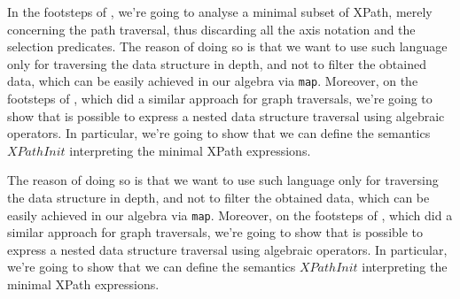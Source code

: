 In the footsteps of \cite{Magnani06}, we're going to analyse a minimal subset of XPath, merely concerning the path traversal, thus discarding all the axis notation and the selection predicates. The reason of doing so is that we want to use such language only for traversing the data structure in depth, and not to filter the obtained data, which can be easily achieved in our algebra via \texttt{map}. Moreover, on the footsteps of \cite{NautiLOD}, which did a similar approach for graph traversals, we're going to show that is possible to express a nested data structure traversal using algebraic operators. In particular, we're going to show that we can define the semantics $XPathInit$ interpreting the minimal XPath expressions.

The reason of doing so is that we want to use such language only for traversing the data structure in depth, and not to filter the obtained data, which can be easily achieved in our algebra via \texttt{map}. Moreover, on the footsteps of \cite{NautiLOD}, which did a similar approach for graph traversals, we're going to show that is possible to express a nested data structure traversal using algebraic operators. In particular, we're going to show that we can define the semantics $XPathInit$ interpreting the minimal XPath expressions.


